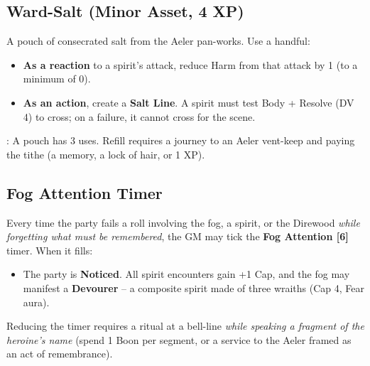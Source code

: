 \documentclass[12pt]{article}
\begin{document}
\subsection{Ward-Salt (Minor Asset, 4 XP)}
A pouch of consecrated salt from the Aeler pan-works. Use a handful:
\begin{itemize}[leftmargin=*]
  \item \textbf{As a reaction} to a spirit's attack, reduce Harm from that attack by 1 (to a minimum of 0).
  \item \textbf{As an action}, create a \textbf{Salt Line}. A spirit must test Body + Resolve (DV 4) to cross; on a failure, it cannot cross for the scene.
\end{itemize}
\depletion: A pouch has 3 uses. Refill requires a journey to an Aeler vent-keep and paying the tithe (a memory, a lock of hair, or 1 XP).

\subsection{Fog Attention Timer }
Every time the party fails a roll involving the fog, a spirit, or the Direwood \textit{while forgetting what must be remembered}, the GM may tick the \textbf{Fog Attention [6]} timer. When it fills:
\begin{itemize}[leftmargin=*]
  \item The party is \textbf{Noticed}. All spirit encounters gain +1 Cap, and the fog may manifest a \textbf{Devourer} -- a composite spirit made of three wraiths (Cap 4, Fear aura).
\end{itemize}
Reducing the timer requires a ritual at a bell-line \textit{while speaking a fragment of the heroine's name} (spend 1 Boon per segment, or a service to the Aeler framed as an act of remembrance).
\end{document}
